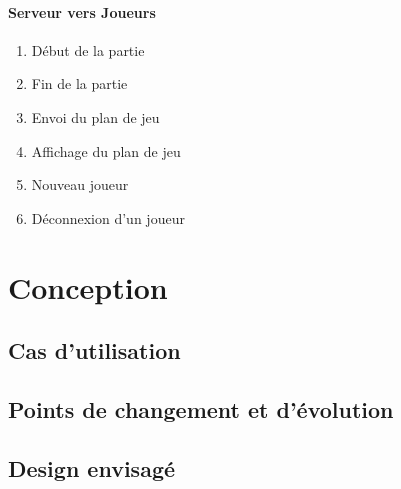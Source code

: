 \documentclass{report}
\begin{document}
			\subsubsection{Serveur vers Joueurs}
				 \label{serveurJoueur}
				
				\begin{enumerate}
					\item Début de la partie
					 \label{debutPartie}
					\item Fin de la partie
					 \label{finPartie}
					\item Envoi du plan de jeu
					 \label{envoiPlan}
					\item Affichage du plan de jeu
					 \label{affichePlan}
					\item Nouveau joueur
					 \label{nouveauJoueur}
					\item Déconnexion d'un joueur
					 \label{joueurParti}
					
				\end{enumerate}			

\chapter{Conception}
			
	\section{Cas d'utilisation}
			 \label{cas_utilisation}
			
	\section{Points de changement et d'évolution}
			 \label{changement}
			 \label{evolution}
			
	\section{Design envisagé}
			 \label{design}
			
\end{document}
